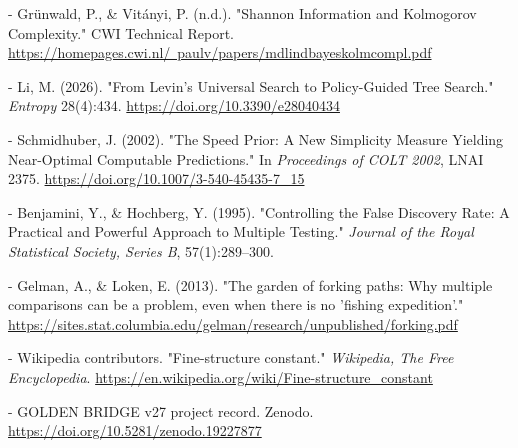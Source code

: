 - Grünwald, P., \& Vitányi, P. (n.d.). "Shannon Information and Kolmogorov Complexity." CWI Technical Report. \href{https://homepages.cwi.nl/~paulv/papers/mdlindbayeskolmcompl.pdf}{https://homepages.cwi.nl/~paulv/papers/mdlindbayeskolmcompl.pdf}

- Li, M. (2026). "From Levin's Universal Search to Policy-Guided Tree Search." \textit{Entropy} 28(4):434. \href{https://doi.org/10.3390/e28040434}{https://doi.org/10.3390/e28040434}

- Schmidhuber, J. (2002). "The Speed Prior: A New Simplicity Measure Yielding Near-Optimal Computable Predictions." In \textit{Proceedings of COLT 2002}, LNAI 2375. \href{https://doi.org/10.1007/3-540-45435-7\_15}{https://doi.org/10.1007/3-540-45435-7\_15}

- Benjamini, Y., \& Hochberg, Y. (1995). "Controlling the False Discovery Rate: A Practical and Powerful Approach to Multiple Testing." \textit{Journal of the Royal Statistical Society, Series B}, 57(1):289--300.

- Gelman, A., \& Loken, E. (2013). "The garden of forking paths: Why multiple comparisons can be a problem, even when there is no 'fishing expedition'." \href{https://sites.stat.columbia.edu/gelman/research/unpublished/forking.pdf}{https://sites.stat.columbia.edu/gelman/research/unpublished/forking.pdf}

- Wikipedia contributors. "Fine-structure constant." \textit{Wikipedia, The Free Encyclopedia}. \href{https://en.wikipedia.org/wiki/Fine-structure\_constant}{https://en.wikipedia.org/wiki/Fine-structure\_constant}

- GOLDEN BRIDGE v27 project record. Zenodo. \href{https://doi.org/10.5281/zenodo.19227877}{https://doi.org/10.5281/zenodo.19227877}
